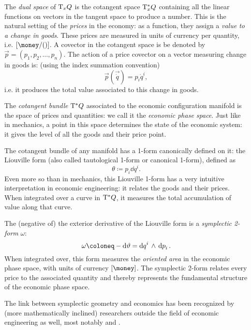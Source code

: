 The \emph{dual space} of \(\mathrm{T}_{x} Q\) is the cotangent space \(\mathrm{T}_{x}^*Q\) containing all the linear functions on vectors in the tangent space to produce a number. This is the natural setting of the \emph{prices} in the economy: as a function, they assign a \emph{value to a change in goods}. These prices are measured in units of currency per quantity, i.e. \(\qty[\si{\money \per \quantity}]\). A covector in the cotangent space is be denoted by \(\vec{p} = (p_1, p_2, \ldots, p_n)\). The action of a price covector on a vector measuring change in goods is: (using the index summation convention)
\begin{equation}
    \vec{p}(\vec{\dot{q}}) = p_i \dot{q}^i,
\end{equation}
i.e. it produces the total value associated to this change in goods.

The \emph{cotangent bundle} \(\mathrm{T}^*Q\) associated to the economic configuration manifold is the space of prices and quantities: we call it the \emph{economic phase space}. Just like in mechanics, a point in this space determines the state of the economic system: it gives the level of all the goods and their price point.

The cotangent bundle of any manifold has a 1-form canonically defined on it: the Liouville form (also called tautological 1-form or canonical 1-form), defined as
\begin{equation} 
    \theta \coloneq  p_i \dd{q}^i.
\end{equation}
Even more so than in mechanics, this Liouville 1-form has a very intuitive interpretation in economic engineering: it relates the goods and their prices. When integrated over a curve in \(\mathrm{T}^*Q\), it measures the total accumulation of value along that curve.

The (negative of) the exterior derivative of the Liouville form is a \emph{symplectic 2-form} \(\omega\):
\begin{equation}
    \omega \coloneq -\dd{\theta} = \wedgep{\dd{q}^i}{\dd{p}_i}.
\end{equation}
When integrated over, this form measures the \emph{oriented area} in the economic phase space, with units of currency \([\si{\money}]\). The symplectic 2-form relates every price to the associated quantity and thereby represents the fundamental structure of the economic phase space.  

The link between symplectic geometry and economics has been recognized by (more mathematically inclined) researchers outside the field of economic engineering as well, most notably \citet{Russell2011} and \citet{Swierstra2014}.

